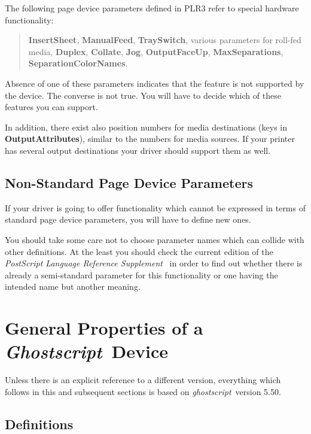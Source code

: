 \documentclass[twoside,a4paper]{article}
\newcommand{\gs}{\textit{ghostscript\/}}
\newcommand{\Gs}{\textit{Ghostscript\/}}
\newcommand{\ps}[1]{{\sffamily\bfseries #1}}	%
\begin{document}
The following page device parameters defined in PLR3 refer to special
hardware functionality:
\begin{quote}
  \ps{InsertSheet}, \ps{ManualFeed}, \ps{TraySwitch},
  various parameters for roll-fed media,
  \ps{Duplex},
  \ps{Collate}, \ps{Jog}, \ps{OutputFaceUp},
  \ps{MaxSeparations}, \ps{SeparationColorNames}.
\end{quote}
Absence of one of these parameters indicates that the feature is not
supported by the device.
The converse is not true.
You will have to decide which of these features you can support.

In addition, there exist also position numbers for media destinations
(keys in \ps{OutputAttributes}),
similar to the numbers for media sources.
If your printer has several output destinations your driver should
support them as well.


\subsection{Non-Standard Page Device Parameters}

If your driver is going to offer functionality which cannot be expressed in
terms of standard page device parameters,
you will have to define new ones.

You should take some care not to choose parameter names which can collide with
other definitions.
At the least you should check the current edition of the
{\it PostScript Language Reference Supplement\/}~\cite{PSSupplement3011}
in order to find out whether there is already a semi-standard parameter
for this functionality or one having the intended name but another meaning.


\section{General Properties of a \Gs\ Device}

Unless there is an explicit reference to a different version,
everything which follows in this and subsequent sections is based on
\gs\ version 5.50.


\subsection{Definitions}
\end{document}
